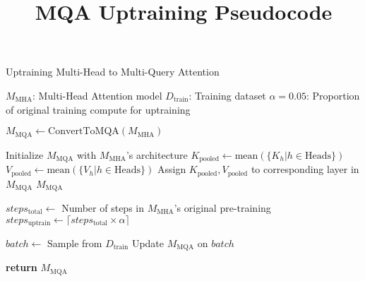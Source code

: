 \documentclass[12pt]{article}
\title{MQA Uptraining Pseudocode}
\author{} %
\date{} %
\begin{document}
\maketitle

\begin{algorithm}
\caption{Uptraining Multi-Head to Multi-Query Attention}
\begin{algorithmic}[1]

\Require $M_{\text{MHA}}$: Multi-Head Attention model
\Require $D_{\text{train}}$: Training dataset
\Require $\alpha = 0.05$: Proportion of original training compute for uptraining

\State $M_{\text{MQA}} \gets \text{ConvertToMQA}(M_{\text{MHA}})$

    \State Initialize $M_{\text{MQA}}$ with $M_{\text{MHA}}$'s architecture
        \State $K_{\text{pooled}} \gets \text{mean}(\{K_{h} | h \in \text{Heads}\})$
        \State $V_{\text{pooled}} \gets \text{mean}(\{V_{h} | h \in \text{Heads}\})$
        \State Assign $K_{\text{pooled}}, V_{\text{pooled}}$ to corresponding layer in $M_{\text{MQA}}$
    \EndFor
    \State \Return $M_{\text{MQA}}$
\EndFunction

\State $steps_{\text{total}} \gets$ Number of steps in $M_{\text{MHA}}$'s original pre-training
\State $steps_{\text{uptrain}} \gets \lceil steps_{\text{total}} \times \alpha \rceil$

    \State $batch \gets$ Sample from $D_{\text{train}}$
    \State Update $M_{\text{MQA}}$ on $batch$ 
\EndFor

\State \textbf{return} $M_{\text{MQA}}$

\end{algorithmic}
\end{algorithm}
\end{document}
